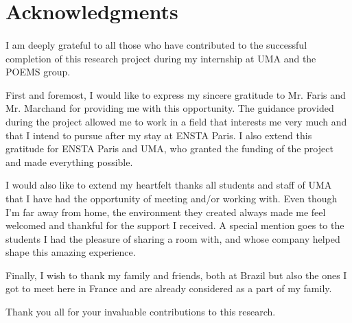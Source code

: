 \section*{Acknowledgments}
\paragraph{}

I am deeply grateful to all those who have contributed to the successful completion of this research project during my internship at UMA and the POEMS group.

First and foremost, I would like to express my sincere gratitude to Mr. Faris and Mr. Marchand for providing me with this opportunity. The guidance provided during the project allowed me to work in a field that interests me very much and that I intend to pursue after my stay at ENSTA Paris. I also extend this gratitude for ENSTA Paris and UMA, who granted the funding of the project and made everything possible.

I would also like to extend my heartfelt thanks all students and staff of UMA that I have had the opportunity of meeting and/or working with. Even though I'm far away from home, the environment they created always made me feel welcomed and thankful for the support I received. A special mention goes to the students I had the pleasure of sharing a room with, and whose company helped shape this amazing experience.

Finally, I wish to thank my family and friends, both at Brazil but also the ones I got to meet here in France and are already considered as a part of my family. 

Thank you all for your invaluable contributions to this research.